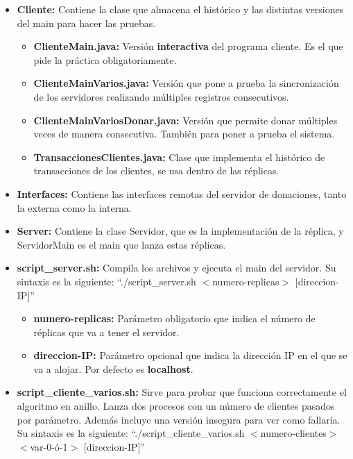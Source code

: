 \documentclass{article}
\begin{document}
\begin{itemize}
    \item \textbf{Cliente: }Contiene la clase que almacena el histórico y las distintas versiones del main para hacer las pruebas.

    \begin{itemize}
        \item \textbf{ClienteMain.java: }Versión \textbf{interactiva} del programa cliente. Es el que pide la práctica obligatoriamente.
        \item \textbf{ClienteMainVarios.java: }Versión que pone a prueba la sincronización de los servidores realizando múltiples registros consecutivos.
        \item \textbf{ClienteMainVariosDonar.java: }Versión que permite donar múltiples veces de manera consecutiva. También para poner a prueba el sistema.
        \item \textbf{TransaccionesClientes.java: }Clase que implementa el histórico de transacciones de los clientes, se usa dentro de las réplicas.
    \end{itemize}

    \item \textbf{Interfaces: }Contiene las interfaces remotas del servidor de donaciones, tanto la externa como la interna.
    
    \item \textbf{Server: }Contiene la clase Servidor, que es la implementación de la réplica, y ServidorMain es el main que lanza estas réplicas.
    
    \item \textbf{script\_server.sh: }Compila los archivos y ejecuta el main del servidor. Su sintaxis es la siguiente: ``./script\_server.sh $<$numero-replicas$>$ [direccion-IP]''
    
    \begin{itemize}
        \item \textbf{numero-replicas: }Parámetro obligatorio que indica el número de réplicas que va a tener el servidor.
        \item \textbf{direccion-IP: }Parámetro opcional que indica la dirección IP en el que se va a alojar. Por defecto es \textbf{localhost}.
    \end{itemize}

    \item \textbf{script\_cliente\_varios.sh: }Sirve para probar que funciona correctamente el algoritmo en anillo. Lanza dos procesos con un número de clientes pasados por parámetro. Además incluye una versión insegura para ver como fallaría. Su sintaxis es la siguiente: ``./script\_cliente\_varios.sh $<$numero-clientes$>$ $<$var-0-ó-1$>$ [direccion-IP]''
    

\end{itemize}
\end{document}
